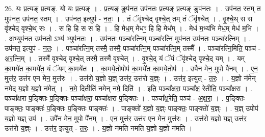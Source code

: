 \documentclass[17pt]{extarticle}
\begin{document}
26. यः प्र॒त्यङ् प्र॒त्यङ्. यो यः प्र॒त्यङ् । . प्र॒त्यङ् ङुप॑नत॒ उप॑नतः प्र॒त्यङ् प्र॒त्यङ् ङुप॑नतः । . उप॑नत॒ स्तम् त मुप॑नत॒ उप॑नत॒ स्तम् । . उप॑नत॒ इत्युप॑ - न॒तः॒ । . तं ॅवृ॑श्चेद् वृश्चे॒त् तम् तं ॅवृ॑श्चेत् । . वृ॒श्चे॒थ् स स वृ॑श्चेद् वृश्चे॒थ् सः । . स हि हि स स हि । . हि मेध॒म् मेधꣳ॒॒ हि हि मेध᳚म् । . मेध॑ म॒भ्य॑भि मेध॒म् मेध॑ म॒भि । . अ॒भ्युप॑नत॒ उप॑नतो॒ ऽभ्य॑ भ्युप॑नतः । . उप॑नतः॒ पञ्चा॑रत्नि॒म् पञ्चा॑रत्नि॒ मुप॑नत॒ उप॑नतः॒ पञ्चा॑रत्निम् । . उप॑नत॒ इत्युप॑ - न॒तः॒ । . पञ्चा॑रत्नि॒म् तस्मै॒ तस्मै॒ पञ्चा॑रत्नि॒म् पञ्चा॑रत्नि॒म् तस्मै᳚ । . पञ्चा॑रत्नि॒मिति॒ पञ्च॑ - अ॒र॒त्नि॒म् । . तस्मै॑ वृश्चेद् वृश्चे॒त् तस्मै॒ तस्मै॑ वृश्चेत् । . वृ॒श्चे॒द् यं ॅयं ॅवृ॑श्चेद् वृश्चे॒द् यम् । . यम् का॒मये॑त का॒मये॑त॒ यं ॅयम् का॒मये॑त । . का॒मये॒तोपोप॑ का॒मये॑त का॒मये॒तोप॑ । . उपै॑न मेन॒ मुपो पै॑नम् । . ए॒न॒ मुत्त॑र॒ उत्त॑र एन मेन॒ मुत्त॑रः । . उत्त॑रो य॒ज्ञो य॒ज्ञ् उत्त॑र॒ उत्त॑रो य॒ज्ञ्ः । . उत्त॑र॒ इत्युत् - त॒रः॒ । . य॒ज्ञो न॑मेन् नमेद् य॒ज्ञो य॒ज्ञो न॑मेत् । . न॒मे॒ दितीति॑ नमेन् नमे॒ दिति॑ । . इति॒ पञ्चा᳚क्षरा॒ पञ्चा᳚क्ष॒ रेतीति॒ पञ्चा᳚क्षरा । . पञ्चा᳚क्षरा प॒ङ्क्तिः प॒ङ्क्तिः पञ्चा᳚क्षरा॒ पञ्चा᳚क्षरा प॒ङ्क्तिः । . पञ्चा᳚क्ष॒रेति॒ पञ्च॑ - अ॒क्ष॒रा॒ । . प॒ङ्क्तिः पाङ्क्तः॒ पाङ्क्तः॑ प॒ङ्क्तिः प॒ङ्क्तिः पाङ्क्तः॑ । . पाङ्क्तो॑ य॒ज्ञो य॒ज्ञ्ः पाङ्क्तः॒ पाङ्क्तो॑ य॒ज्ञ्ः । . य॒ज्ञ् उपोप॑ य॒ज्ञो य॒ज्ञ् उप॑ । . उपै॑न मेन॒ मुपो पै॑नम् । . ए॒न॒ मुत्त॑र॒ उत्त॑र एन मेन॒ मुत्त॑रः । . उत्त॑रो य॒ज्ञो य॒ज्ञ् उत्त॑र॒ उत्त॑रो य॒ज्ञ्ः । . उत्त॑र॒ इत्युत् - त॒रः॒ । . य॒ज्ञो न॑मति नमति य॒ज्ञो य॒ज्ञो न॑मति । \newline
\end{document}
